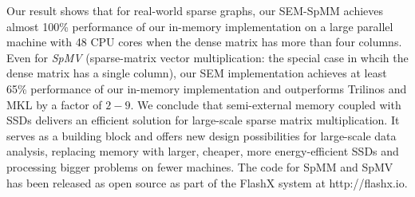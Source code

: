 Our result shows that for real-world sparse graphs, our SEM-SpMM achieves almost
100\% performance of our in-memory implementation on a large parallel machine
with 48 CPU cores when the dense matrix has more than four columns. Even for
{\em SpMV} (sparse-matrix vector multiplication: the special case in whcih the dense 
matrix has a single column), our SEM implementation achieves at least 65\% 
performance of our in-memory implementation and outperforms Trilinos \cite{trilinos} and MKL \cite{mkl} by
a factor of $2-9$. 
We conclude that semi-external memory coupled with SSDs delivers an efficient
solution for large-scale sparse matrix multiplication. It serves
as a building block and offers new design possibilities for large-scale
data analysis, replacing memory with larger, cheaper, more energy-efficient SSDs
and processing bigger problems on fewer machines. The code for SpMM and SpMV has been 
released as open source as part of the FlashX system at http://flashx.io.
